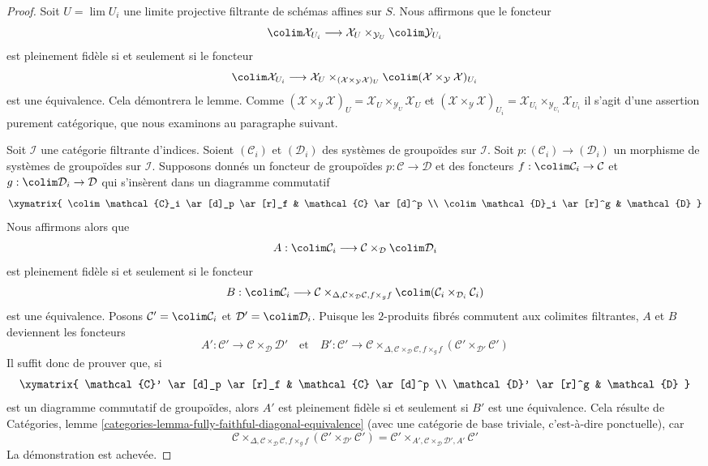 \begin{proof}
Soit $U = \lim U_i$ une limite projective filtrante de schémas affines sur
$S$. Nous affirmons que le foncteur
$$
\colim \mathcal{X}_{U_i} \longrightarrow
\mathcal{X}_U \times_{\mathcal{Y}_U} \colim \mathcal{Y}_{U_i}
$$
est pleinement fidèle si et seulement si le foncteur
$$
\colim \mathcal{X}_{U_i} \longrightarrow
\mathcal{X}_U \times_{(\mathcal{X} \times_\mathcal{Y} \mathcal{X})_U}
\colim (\mathcal{X} \times_\mathcal{Y} \mathcal{X})_{U_i}
$$
est une équivalence. Cela démontrera le lemme. Comme
$(\mathcal{X} \times_\mathcal{Y} \mathcal{X})_U =
\mathcal{X}_U \times_{\mathcal{Y}_U} \mathcal{X}_U$
et
$(\mathcal{X} \times_\mathcal{Y} \mathcal{X})_{U_i} =
\mathcal{X}_{U_i} \times_{\mathcal{Y}_{U_i}} \mathcal{X}_{U_i}$
il s'agit d'une assertion purement catégorique, que nous examinons au
paragraphe suivant.

\medskip\noindent
Soit $\mathcal{I}$ une catégorie filtrante d'indices. Soient
$(\mathcal{C}_i)$ et $(\mathcal{D}_i)$ des systèmes de groupoïdes sur
$\mathcal{I}$. Soit
$p : (\mathcal{C}_i) \to (\mathcal{D}_i)$ un morphisme de systèmes de
groupoïdes sur $\mathcal{I}$. Supposons donnés un foncteur de groupoïdes
$p : \mathcal{C} \to \mathcal{D}$ et des foncteurs
$f : \colim \mathcal{C}_i \to \mathcal{C}$ et
$g : \colim \mathcal{D}_i \to \mathcal{D}$
qui s'insèrent dans un diagramme commutatif
$$
\xymatrix{
\colim \mathcal{C}_i \ar[d]_p \ar[r]_f & \mathcal{C} \ar[d]^p \\
\colim \mathcal{D}_i \ar[r]^g & \mathcal{D}
}
$$
Nous affirmons alors que
$$
A : \colim \mathcal{C}_i \longrightarrow
\mathcal{C} \times_\mathcal{D} \colim \mathcal{D}_i
$$
est pleinement fidèle si et seulement si le foncteur
$$
B : \colim \mathcal{C}_i \longrightarrow
\mathcal{C}
\times_{\Delta, \mathcal{C} \times_\mathcal{D} \mathcal{C}, f \times_g f}
\colim (\mathcal{C}_i \times_{\mathcal{D}_i} \mathcal{C}_i)
$$
est une équivalence. Posons $\mathcal{C}' = \colim \mathcal{C}_i$ et
$\mathcal{D}' = \colim \mathcal{D}_i$. Puisque les $2$-produits fibrés
commutent aux colimites filtrantes, $A$ et $B$ deviennent les foncteurs
$$
A' : \mathcal{C}' \to \mathcal{C} \times_\mathcal{D} \mathcal{D}'
\quad\text{et}\quad
B' : \mathcal{C}' \longrightarrow
\mathcal{C}
\times_{\Delta, \mathcal{C} \times_\mathcal{D} \mathcal{C}, f \times_g f}
(\mathcal{C}' \times_{\mathcal{D}'} \mathcal{C}')
$$
Il suffit donc de prouver que, si
$$
\xymatrix{
\mathcal{C}' \ar[d]_p \ar[r]_f & \mathcal{C} \ar[d]^p \\
\mathcal{D}' \ar[r]^g & \mathcal{D}
}
$$
est un diagramme commutatif de groupoïdes, alors $A'$ est pleinement fidèle
si et seulement si $B'$ est une équivalence. Cela résulte de Catégories,
lemme \ref{categories-lemma-fully-faithful-diagonal-equivalence} (avec une
catégorie de base triviale, c'est-à-dire ponctuelle), car
$$
\mathcal{C}
\times_{\Delta, \mathcal{C} \times_\mathcal{D} \mathcal{C}, f \times_g f}
(\mathcal{C}' \times_{\mathcal{D}'} \mathcal{C}') =
\mathcal{C}'
\times_{A', \mathcal{C} \times_\mathcal{D} \mathcal{D}', A'}
\mathcal{C}'
$$
La démonstration est achevée.
\end{proof}

